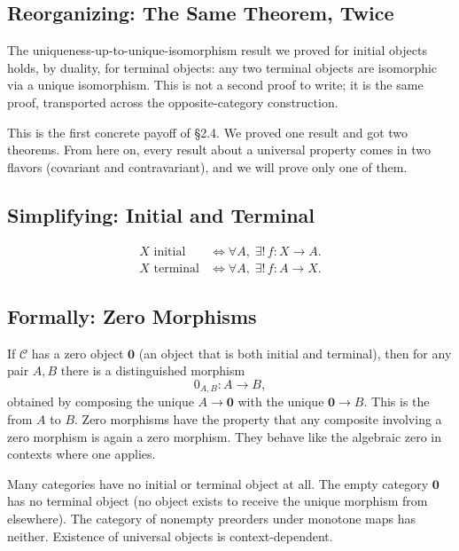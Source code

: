 \subsection{Reorganizing: The Same Theorem, Twice}

The uniqueness-up-to-unique-isomorphism result we proved for initial objects
holds, by duality, for terminal objects: any two terminal objects are
isomorphic via a unique isomorphism. This is not a second proof to write;
it is the same proof, transported across the opposite-category construction.

This is the first concrete payoff of \S2.4. We proved one result and got
two theorems. From here on, every result about a universal property comes
in two flavors (covariant and contravariant), and we will prove only one
of them.

\subsection{Simplifying: Initial and Terminal}

\begin{align*}
  X \text{ initial}
    &\iff \forall A,\; \exists ! \, f : X \to A. \\
  X \text{ terminal}
    &\iff \forall A,\; \exists ! \, f : A \to X.
\end{align*}

\subsection{Formally: Zero Morphisms}

If $\mathcal{C}$ has a zero object $\mathbf{0}$ (an object that is both
initial and terminal), then for any pair $A, B$ there is a distinguished
morphism
\begin{equation*}
  0_{A,B} : A \to B,
\end{equation*}
obtained by composing the unique $A \to \mathbf{0}$ with the unique
$\mathbf{0} \to B$. This is the  from $A$ to $B$.
Zero morphisms have the property that any composite involving a zero
morphism is again a zero morphism. They behave like the algebraic zero in
contexts where one applies.

Many categories have no initial or terminal object at all. The empty
category $\mathbf{0}$ has no terminal object (no object exists to receive
the unique morphism from elsewhere). The category of nonempty preorders
under monotone maps has neither. Existence of universal objects is
context-dependent.


